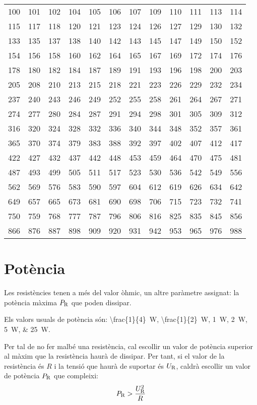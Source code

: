 \vspace{3mm}
\begin{center}
   \begin{tabular}{cccccccccccc}
   \toprule[1pt]
   100 & 101 & 102 & 104 & 105 & 106 & 107 & 109 & 110 & 111 & 113 & 114 \\
   115 & 117 & 118 & 120 & 121 & 123 & 124 & 126 & 127 & 129 & 130 & 132 \\
   133 & 135 & 137 & 138 & 140 & 142 & 143 & 145 & 147 & 149 & 150 & 152 \\
   154 & 156 & 158 & 160 & 162 & 164 & 165 & 167 & 169 & 172 & 174 & 176 \\
   178 & 180 & 182 & 184 & 187 & 189 & 191 & 193 & 196 & 198 & 200 & 203 \\
   205 & 208 & 210 & 213 & 215 & 218 & 221 & 223 & 226 & 229 & 232 & 234 \\
   237 & 240 & 243 & 246 & 249 & 252 & 255 & 258 & 261 & 264 & 267 & 271 \\
   274 & 277 & 280 & 284 & 287 & 291 & 294 & 298 & 301 & 305 & 309 & 312 \\
   316 & 320 & 324 & 328 & 332 & 336 & 340 & 344 & 348 & 352 & 357 & 361 \\
   365 & 370 & 374 & 379 & 383 & 388 & 392 & 397 & 402 & 407 & 412 & 417 \\
   422 & 427 & 432 & 437 & 442 & 448 & 453 & 459 & 464 & 470 & 475 & 481 \\
   487 & 493 & 499 & 505 & 511 & 517 & 523 & 530 & 536 & 542 & 549 & 556 \\
   562 & 569 & 576 & 583 & 590 & 597 & 604 & 612 & 619 & 626 & 634 & 642 \\
   649 & 657 & 665 & 673 & 681 & 690 & 698 & 706 & 715 & 723 & 732 & 741 \\
   750 & 759 & 768 & 777 & 787 & 796 & 806 & 816 & 825 & 835 & 845 & 856 \\
   866 & 876 & 887 & 898 & 909 & 920 & 931 & 942 & 953 & 965 & 976 & 988 \\
   \bottomrule[1pt]
   \end{tabular}
\end{center}


\section{Potència} \label{sec:resist-pot}

Les resistències tenen a més del valor òhmic, un altre paràmetre assignat: la potència màxima $P_\mathrm{R}$ que poden dissipar.

Els valors usuals de potència són: \qtylist[parse-numbers = false]{\frac{1}{4}; \frac{1}{2}; 1; 2; 5; 25}{W}.

Per tal de no fer malbé una resistència, cal escollir un valor de potència superior al màxim que la resistència haurà de dissipar. Per tant, si el valor de la resistència és $R$ i la tensió  que haurà de suportar és $U_\mathrm{R}$, caldrà escollir un valor de potència $P_\mathrm{R}$ que compleixi:
\begin{equation}
  P_\mathrm{R} > \frac{U_\mathrm{R}^2}{R}
\end{equation}
